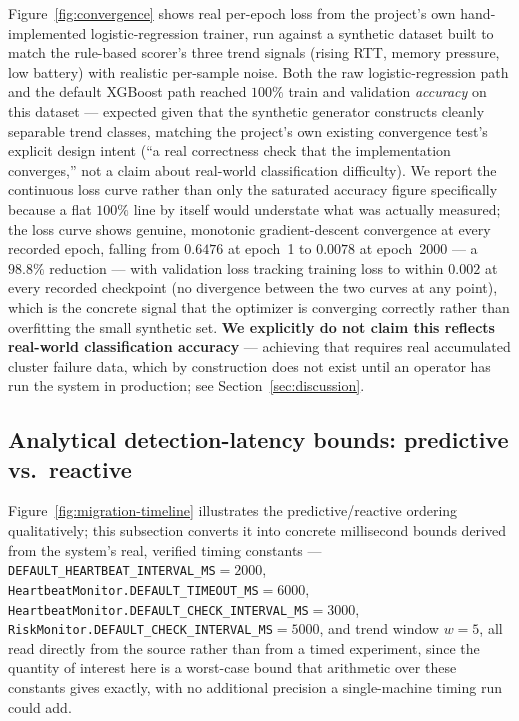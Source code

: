 \documentclass[conference]{IEEEtran}
\begin{document}
Figure~\ref{fig:convergence} shows real per-epoch loss from the project's own hand-implemented
logistic-regression trainer, run against a synthetic dataset built to match the rule-based scorer's
three trend signals (rising RTT, memory pressure, low battery) with realistic per-sample noise. Both
the raw logistic-regression path and the default XGBoost path reached $100\%$ train and validation
\emph{accuracy} on this dataset — expected given that the synthetic generator constructs cleanly
separable trend classes, matching the project's own existing convergence test's explicit design intent
(``a real correctness check that the implementation converges,'' not a claim about real-world
classification difficulty). We report the continuous loss curve rather than only the saturated
accuracy figure specifically because a flat $100\%$ line by itself would understate what was actually
measured; the loss curve shows genuine, monotonic gradient-descent convergence at every recorded
epoch, falling from $0.6476$ at epoch~1 to $0.0078$ at epoch~2000 — a $98.8\%$ reduction — with
validation loss tracking training loss to within $0.002$ at every recorded checkpoint (no divergence
between the two curves at any point), which is the concrete signal that the optimizer is converging
correctly rather than overfitting the small synthetic set. \textbf{We explicitly do not claim this
reflects real-world classification accuracy} — achieving that requires real accumulated cluster
failure data, which by construction does not exist until an operator has run the system in production;
see Section~\ref{sec:discussion}.

\subsection{Analytical detection-latency bounds: predictive vs.\ reactive}
\label{sec:latency-bounds}

Figure~\ref{fig:migration-timeline} illustrates the predictive/reactive ordering qualitatively; this
subsection converts it into concrete millisecond bounds derived from the system's real, verified
timing constants — \texttt{DEFAULT\_HEARTBEAT\_INTERVAL\_MS}$=2000$,
\texttt{HeartbeatMonitor.DEFAULT\_TIMEOUT\_MS}$=6000$,
\texttt{HeartbeatMonitor.DEFAULT\_CHECK\_INTERVAL\_MS}$=3000$,
\texttt{RiskMonitor.DEFAULT\_CHECK\_INTERVAL\_MS}$=5000$, and trend window $w=5$, all read directly
from the source rather than from a timed experiment, since the quantity of interest here is a
worst-case bound that arithmetic over these constants gives exactly, with no additional precision a
single-machine timing run could add.
\end{document}
